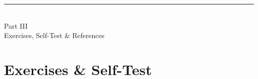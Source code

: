 \documentclass[aspectratio=169,10pt]{beamer}
\begin{document}
\begin{frame}
  \vfill\centering
  {\color{awsorange}\rule{0.25\paperwidth}{2.5pt}}\\[0.8em]
  {\color{awsink}Part III}\\[0.4em]
  {\Large\color{awsink}Exercises, Self-Test \& References}
  \vfill
\end{frame}

\section{Exercises \& Self-Test}

\end{document}
